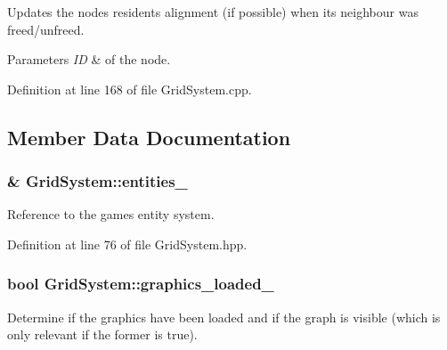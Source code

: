 Updates the nodes resident\textquotesingle{}s alignment (if possible) when it\textquotesingle{}s neighbour was freed/unfreed. 


\begin{DoxyParams}{Parameters}
{\em ID} & of the node. \\
\hline
\end{DoxyParams}


Definition at line 168 of file Grid\+System.\+cpp.



\subsection{Member Data Documentation}
\subsubsection[{\texorpdfstring{entities\+\_\+}{entities_}}]{\& Grid\+System\+::entities\+\_\+\hspace{0.3cm}{\ttfamily [private]}}\hypertarget{class_grid_system_a76b61fafd9e04fe8a6b67c327d2eeac5}{}\label{class_grid_system_a76b61fafd9e04fe8a6b67c327d2eeac5}


Reference to the game\textquotesingle{}s entity system. 



Definition at line 76 of file Grid\+System.\+hpp.

\subsubsection[{\texorpdfstring{graphics\+\_\+loaded\+\_\+}{graphics_loaded_}}]{\setlength{\rightskip}{0pt plus 5cm}bool Grid\+System\+::graphics\+\_\+loaded\+\_\+\hspace{0.3cm}{\ttfamily [private]}}\hypertarget{class_grid_system_a449d916909013f7d41f81e1ff236d0f6}{}\label{class_grid_system_a449d916909013f7d41f81e1ff236d0f6}


Determine if the graphics have been loaded and if the graph is visible (which is only relevant if the former is true). 



